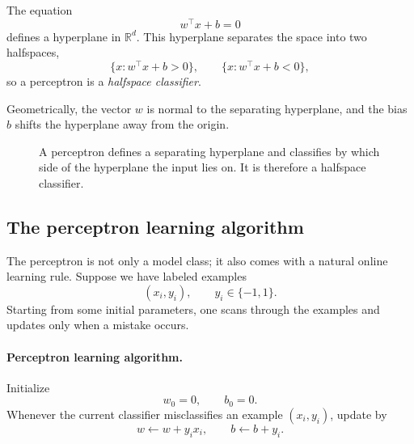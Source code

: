 The equation
\[
w^\top x+b=0
\]
defines a hyperplane in $\mathbb R^d$. This hyperplane separates the space into two halfspaces,
\[
\{x: w^\top x+b>0\},
\qquad
\{x: w^\top x+b<0\},
\]
so a perceptron is a \emph{halfspace classifier}.

Geometrically, the vector $w$ is normal to the separating hyperplane, and the bias $b$ shifts the hyperplane away from the origin.

\begin{figure}[tbp]
\centering
{}
\caption{A perceptron defines a separating hyperplane and classifies by which side of the hyperplane the input lies on. It is therefore a halfspace classifier.}
\end{figure}

\subsection*{The perceptron learning algorithm}

The perceptron is not only a model class; it also comes with a natural online learning rule. Suppose we have labeled examples
\[
(x_i,y_i), \qquad y_i\in\{-1,1\}.
\]
Starting from some initial parameters, one scans through the examples and updates only when a mistake occurs.

\paragraph{Perceptron learning algorithm.}
Initialize
\[
w_0=0,\qquad b_0=0.
\]
Whenever the current classifier misclassifies an example $(x_i,y_i)$, update by
\[
w \leftarrow w + y_i x_i,
\qquad
b \leftarrow b + y_i.
\]

